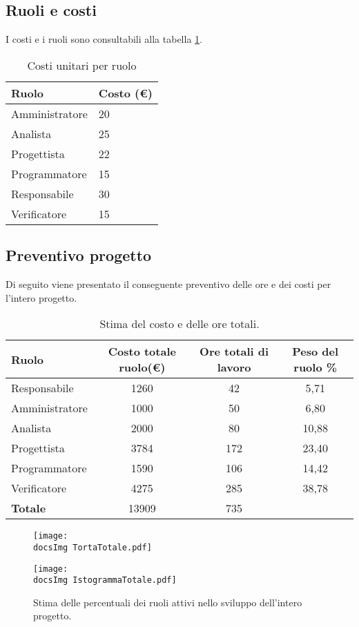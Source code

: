 {{}
	\subsection{Ruoli e costi}{
	I costi e i ruoli sono consultabili alla tabella \ref{tabellaCostiUnitari}.
	\begin{table}[h!]
	 \centering
		\begin{tabular}{p{} p{}}	
				\toprule
				Ruolo			&	Costo (\euro) \\ 
				\midrule
				Amministratore &	 20\\
				Analista 	&	25\\
				Progettista	& 	22\\ 
				Programmatore & 15\\
				Responsabile & 30  \\
				Verificatore &	15  \\
				\bottomrule
			\end{tabular}
			\caption{Costi unitari per ruolo}	
			 \label{tabellaCostiUnitari}
	\end{table}	
	}
 

\newpage
	\subsection{Preventivo progetto \mytalk}{
	Di seguito viene presentato il conseguente preventivo delle ore e dei costi per l'intero progetto.
		\begin{table}[h!]
		\begin{center}
			\begin{tabular}{l c c c}				
				\toprule
				Ruolo&	Costo totale ruolo(\euro) 	&	Ore totali di lavoro &	Peso del ruolo \%  \\ 
				\midrule
				Responsabile&	1260	&	42&	5,71\\
				Amministratore&	1000	& 50&	6,80\\
				Analista&	2000	&	80&	10,88\\
				Progettista&		3784&	172&	 23,40\\
				Programmatore&	1590	&	106&		14,42\\
				Verificatore&	4275&	285&		38,78\\ \hline
				\textbf{Totale}&		13909&	735&\\
				\bottomrule
			\end{tabular}
		\end{center}	
		\caption{Stima del costo e delle ore totali.}
	\end{table}
	\begin{figure}[h!]
	\centering
		\texttt{[image: \\docsImg TortaTotale.pdf]}
		\caption{Stima delle percentuali dei ruoli attivi nello sviluppo dell'intero progetto.} 
		\label{fig: prev}
		\texttt{[image: \\docsImg IstogrammaTotale.pdf]}


\end{figure}}}

